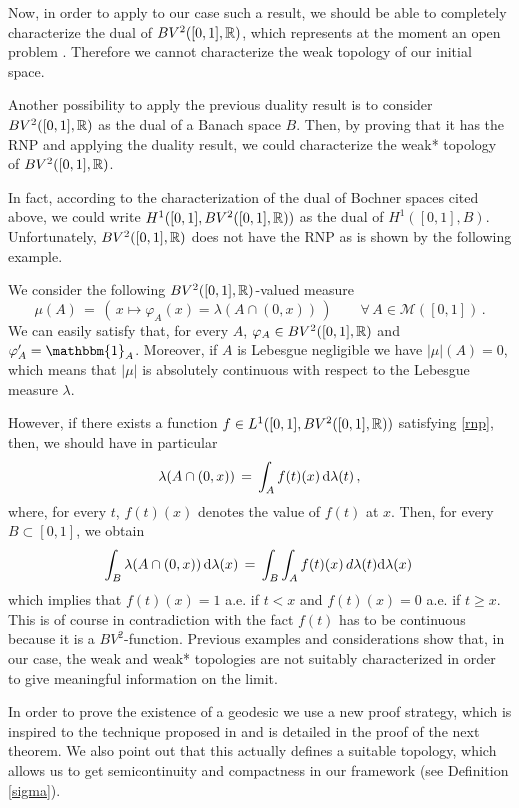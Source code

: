 \begin{rem}
Now, in order to apply to our case such a result, we should be able to completely characterize the dual of $BV^2([0,1],\mathbb{R})$, which represents at the moment an open problem \cite{MZ, Pauw}. Therefore we cannot characterize the weak topology of our initial space.

Another possibility to apply the previous duality result is to consider $BV^2([0,1],{\mathbb R})$ as the dual  of a Banach space $B$. Then, by proving that it has the RNP and applying the duality result, we could  characterize the weak* topology of $BV^2([0,1],{\mathbb R})$.  

In fact, according to the characterization of the dual of  Bochner spaces cited above, we could write $H^1([0,1],BV^2([0,1],{\mathbb R}))$ as the dual of $H^1([0,1],B)$.
Unfortunately, $BV^2([0,1],{\mathbb R})$ does not have the RNP as  is shown  by the following example. 

We consider the following $BV^2([0,1],\mathbb{R})$-valued measure
$$\mu(A)\,=\,(\,x\mapsto \varphi_A(x)=\lambda(A\cap (0,x))\,)\quad \quad\forall\, A\in \mathcal{M}([0,1])\,.$$
We can easily satisfy that, for every $A$, $\varphi_A\in BV^2([0,1],{\mathbb R})$ and $\varphi_A'=\mathbbm{1}_A$. Moreover, if $A$ is Lebesgue negligible we have $|\mu|(A)=0$, which means that $|\mu|$ is absolutely continuous with respect to the Lebesgue measure $\lambda$. 

However, if there exists a function $f\in L^1([0,1],BV^2([0,1],\mathbb{R}))$ satisfying \eqref{rnp}, then,   we should have in particular 
$$\lambda(A\cap (0,x))\,=\,\int_A f(t)(x)\, \mathrm{d} \lambda(t)\,,$$
where, for every $t$,  $f(t)(x)$ denotes the value of $f(t)$ at $x$. Then, for every $B\subset [0,1]$, we obtain 
$$\int_B\lambda(A\cap (0,x))\,\mathrm{d} \lambda(x)\,=\,\int_B\int_A f(t)(x)\,d \lambda(t)\mathrm{d} \lambda(x)\,$$
which implies that $f(t)(x)=1$ a.e. if $t<x$ and $f(t)(x)=0$ a.e. if $t\geq x$. This is of course in contradiction with the fact   $f(t)$ has to be continuous because it is a $BV^2$-function.
Previous examples and considerations show that, in our case, the weak and weak* topologies are not suitably characterized in order to give meaningful information on the limit.


In order to prove the existence of a geodesic we use a new proof strategy, which is  inspired to the technique proposed in \cite{MN} and is detailed in the proof of the next theorem. We also point out that 
this actually defines  a suitable topology, which allows  us to get semicontinuity and compactness in our framework (see Definition \ref{sigma}).
\end{rem}


